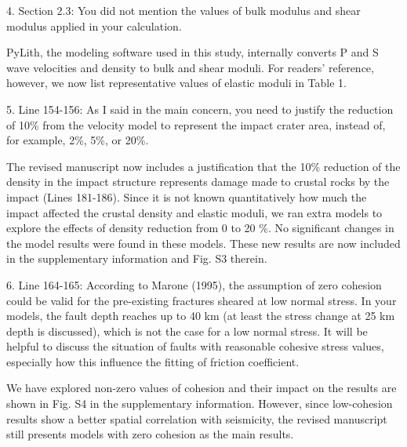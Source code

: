 \documentclass[12pt]{article}
\begin{document}
\begin{response}{4. Section 2.3: You did not mention the values of bulk modulus and shear modulus applied in your calculation.}

  PyLith, the modeling software used in this study, internally converts P and S wave velocities and density to bulk and shear moduli. For readers' reference, however, we now list representative values of elastic moduli in Table 1. 
\end{response}

\begin{response}{5. Line 154-156: As I said in the main concern, you need to justify the reduction of 10\% from the velocity model to represent the impact crater area, instead of, for example, 2\%, 5\%, or 20\%.}

  The revised manuscript now includes a justification that the 10\% reduction of the density in the impact structure represents damage made to crustal rocks by the impact (Lines 181-186). Since it is not known quantitatively how much the impact affected the crustal density and elastic moduli, we ran extra models to explore the effects of density reduction from 0 to 20 \%. No significant changes in the model results were found in these models. These new results are now included in the supplementary information and Fig. S3 therein.
\end{response}

\begin{response}{6. Line 164-165: According to Marone (1995), the assumption of zero cohesion could be valid for the pre-existing fractures sheared at low normal stress. In your models, the fault depth reaches up to 40 km (at least the stress change at 25 km depth is discussed), which is not the case for a low normal stress. It will be helpful to discuss the situation of faults with reasonable cohesive stress values, especially how this influence the fitting of friction coefficient.}

    
    We have explored non-zero values of cohesion and their impact on the results are shown in Fig. S4 in the supplementary information. However, since low-cohesion results show a better spatial correlation with seismicity, the revised manuscript still presents models with zero cohesion as the main results.
    
\end{response}
\end{document}
